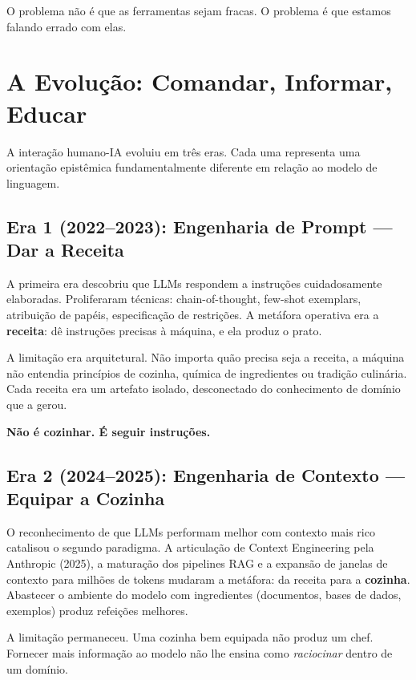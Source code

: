 \documentclass[12pt,a4paper]{article}
\begin{document}
O problema não é que as ferramentas sejam fracas. O problema é que estamos falando errado com elas.

\section{A Evolução: Comandar, Informar, Educar}
\label{sec:evolucao}

A interação humano-IA evoluiu em três eras. Cada uma representa uma orientação epistêmica fundamentalmente diferente em relação ao modelo de linguagem.

\subsection{Era 1 (2022--2023): Engenharia de Prompt --- Dar a Receita}

A primeira era descobriu que LLMs respondem a instruções cuidadosamente elaboradas. Proliferaram técnicas: chain-of-thought, few-shot exemplars, atribuição de papéis, especificação de restrições. A metáfora operativa era a \textbf{receita}: dê instruções precisas à máquina, e ela produz o prato.

A limitação era arquitetural. Não importa quão precisa seja a receita, a máquina não entendia princípios de cozinha, química de ingredientes ou tradição culinária. Cada receita era um artefato isolado, desconectado do conhecimento de domínio que a gerou.

\textbf{Não é cozinhar. É seguir instruções.}

\subsection{Era 2 (2024--2025): Engenharia de Contexto --- Equipar a Cozinha}

O reconhecimento de que LLMs performam melhor com contexto mais rico catalisou o segundo paradigma. A articulação de Context Engineering pela Anthropic (2025), a maturação dos pipelines RAG e a expansão de janelas de contexto para milhões de tokens mudaram a metáfora: da receita para a \textbf{cozinha}. Abastecer o ambiente do modelo com ingredientes (documentos, bases de dados, exemplos) produz refeições melhores.

A limitação permaneceu. Uma cozinha bem equipada não produz um chef. Fornecer mais informação ao modelo não lhe ensina como \emph{raciocinar} dentro de um domínio.
\end{document}
